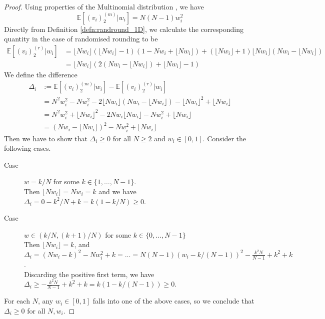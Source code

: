 \documentclass[fleqn]{article}
\theoremstyle{definition}
\newcommand{\E}{\mathbb{E}}
\newcommand{\flnw}{\lfloor Nw_i \rfloor }
\begin{document}
\begin{proof}
Using properties of the Multinomial distribution \citep{mosimann1962}, we have
\begin{equation*}
\E[(v_i)_2^{(m)} | w_i]  = N(N-1)w_i^2
\end{equation*}
Directly from Definition \ref{defn:randround_1D}, we calculate the corresponding quantity in the case of randomised rounding to be
\begin{align*}
\E[(v_i)_2^{(r)} | w_i] &= \flnw (\flnw -1) (1 - Nw_i + \flnw) + (\flnw +1) \flnw (Nw_i - \flnw) \\
&= \flnw \left( 2(Nw_i - \flnw) + \flnw -1 \right)
\end{align*}
We define the difference 
\begin{align*}
\Delta_i &:= \E[(v_i)_2^{(m)} | w_i] - \E[(v_i)_2^{(r)} | w_i] \\
&= N^2w_i^2 - Nw_i^2 - 2\flnw(Nw_i - \flnw) - \flnw^2 + \flnw \\
&= N^2 w_i^2 + \flnw^2 -2Nw_i \flnw - Nw_i^2 + \flnw \\
&= (Nw_i - \flnw)^2 - Nw_i^2 + \flnw 
\end{align*}
Then we have to show that $\Delta_i \geq 0$ for all $N\geq 2$ and $w_i \in [0,1]$. Consider the following cases.
\begin{description}
\item[Case] $w=k/N$ for some $k \in \{1, \dots, N-1\}$. \\
Then $\flnw = Nw_i = k$ and we have\\
$\Delta_i = 0 - k^2/N + k = k(1- k/N) \geq 0$.
\item[Case] $w \in (k/N, (k+1)/N )$ for some $k \in \{0, \dots, N-1\}$ \\
Then $\flnw = k$, and \\
$\Delta_i = (Nw_i - k)^2 - Nw_i^2 + k = ... = N(N-1)(w_i - k/(N-1))^2 - \frac{k^2N}{N-1} + k^2 +k$.\\
Discarding the positive first term, we have $\Delta_i \geq - \frac{k^2N}{N-1} + k^2 +k = k(1- k/(N-1)) \geq 0$.
\end{description}
For each $N$, any $w_i \in [0,1]$ falls into one of the above cases, so we conclude that $\Delta_i \geq 0$ for all $N, w_i$.
\end{proof}



\end{document}
